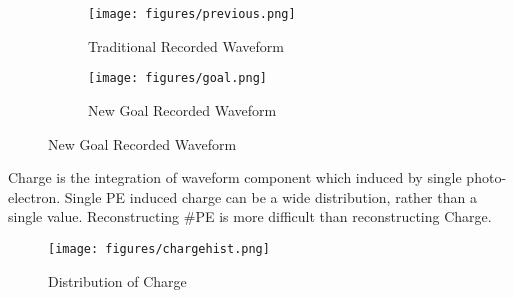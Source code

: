 \begin{figure}[H]
\begin{minipage}{.5\textwidth}
\begin{figure}[H]
    \centering
    \texttt{[image: figures/previous.png]}
    \caption{\label{fig:tradi} Traditional Recorded Waveform}
\end{figure}
\end{minipage}
\begin{minipage}{.5\textwidth}
\begin{figure}[H]
    \centering
    \texttt{[image: figures/goal.png]}
    \caption{\label{fig:new} New Goal Recorded Waveform}
\end{figure}
\end{minipage}
\end{figure}

Charge is the integration of waveform component which induced by single photo-electron. Single PE induced charge can be a wide distribution, rather than a single value. Reconstructing \#PE is more difficult than reconstructing Charge. 

\begin{figure}[H]
    \centering
    \texttt{[image: figures/chargehist.png]}
    \caption{\label{fig:charge} Distribution of Charge}
\end{figure}

